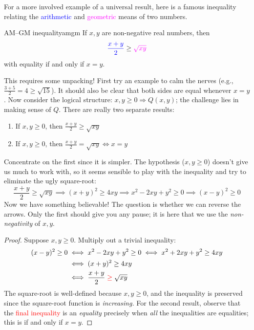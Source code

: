 For a more involved example of a universal result, here is a famous inequality relating the \textcolor{blue}{arithmetic} and \textcolor{Magenta}{geometric} means of two numbers.

\begin{thm}{AM--GM inequality}{amgm}
	If $x,y$ are non-negative real numbers, then
	\[
		\textcolor{blue}{\frac{x+y}{2}}\ge\textcolor{Magenta}{\sqrt{xy}}
	\]
	with equality if and only if $x=y$.
\end{thm}

This requires some unpacking! First try an example to calm the nerves (e.g., $\frac{3+5}2=4\ge \sqrt{15}$). It should also be clear that both sides are equal whenever $x=y$. Now consider the logical structure: $x,y\ge 0\Longrightarrow Q(x,y)$; the challenge lies in making sense of $Q$. There are really two separate results:
\begin{enumerate}
  \item If $x,y\ge 0$, then $\frac{x+y}{2}\ge\sqrt{xy}$
  \item If $x,y\ge 0$, then $\frac{x+y}{2}=\sqrt{xy}\iff x=y$
\end{enumerate}

Concentrate on the first since it is simpler. The hypothesis ($x,y\ge 0$) doesn't give us much to work with, so it seems sensible to play with the inequality and try to eliminate the ugly square-root:
\[
	\frac{x+y}2\ge \sqrt{xy} \implies (x+y)^2\ge 4xy \implies x^2-2xy+y^2\ge 0\implies (x-y)^2\ge 0
\]
Now we have something believable! The question is whether we can reverse the arrows. Only the first should give you any pause; it is here that we use the \emph{non-negativity} of $x,y$.

\begin{proof}
	Suppose $x,y\ge 0$. Multiply out a trivial inequality:
	\begin{align*}
		(x-y)^2\ge 0&\iff x^2-2xy+y^2\ge 0 \iff x^2+2xy+y^2\ge 4xy\\
		&\iff (x+y)^2\ge 4xy\\
		&\iff \frac{x+y}{2}\mathrel{\textcolor{red}{\ge}} \sqrt{xy}
	\end{align*}
	The square-root is well-defined because $x,y\ge 0$, and the inequality is preserved since the square-root function is \emph{increasing.} For the second result, observe that the \textcolor{red}{final inequality} is an \emph{equality} precisely when \emph{all} the inequalities are equalities; this is if and only if $x=y$.
\end{proof}

